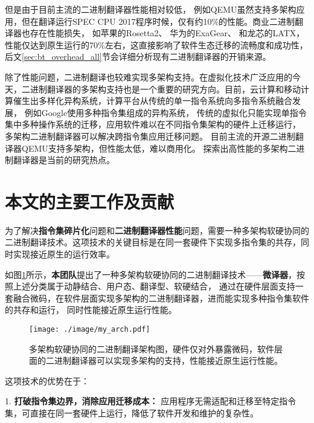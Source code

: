 但是由于目前主流的二进制翻译器性能相对较低，
例如QEMU\cite{bellardQEMUFastPortable2005}虽然支持多架构应用，但在翻译运行SPEC CPU 2017\cite{SPECCPU2017}程序时候，仅有约10\%的性能。商业二进制翻译器也存在性能损失，
如苹果的Rosetta2\cite{RosettaTranslationEnvironment, RunningIntelBinaries}、
华为的ExaGear\cite{KunPengExaGear}、
和龙芯的LATX\cite{LoongArchEnv2022, LoongArch2023}，
性能仅达到原生运行的70\%左右，这直接影响了软件生态迁移的流畅度和成功性，
后文\ref{sec:bt_overhead_all}节会详细分析现有二进制翻译器的开销来源。

除了性能问题，二进制翻译也较难实现多架构支持。在虚拟化技术广泛应用的今天，二进制翻译器的多架构支持也是一个重要的研究方向。目前，云计算和移动计算催生出多样化异构系统，计算平台从传统的单一指令系统向多指令系统融合发展，
例如Google使用多种指令集组成的异构系统，
传统的虚拟化只能实现单指令集中多种操作系统的迁移，应用软件难以在不同指令集架构的硬件上迁移运行，
多架构二进制翻译器可以解决跨指令集应用迁移问题。
目前主流的开源二进制翻译器QEMU支持多架构，但性能太低，难以商用化。
探索出高性能的多架构二进制翻译器是当前的研究热点。

\section{本文的主要工作及贡献}

为了解决\textbf{指令集碎片化}问题和\textbf{二进制翻译器性能}问题，需要一种多架构软硬协同的二进制翻译技术。这项技术的关键目标是在同一套硬件下实现多指令集的共存，同时实现接近原生的运行效率。

如图\ref{img:my_arch}所示，\textbf{本团队}提出了一种多架构软硬协同的二进制翻译技术——\textbf{微译器}，按照上述分类属于动静结合、用户态、翻译型、软硬结合，
通过在硬件层面支持一套融合微码，在软件层面实现多架构的二进制翻译器，进而能实现多种指令集软件的共存和运行，
同时性能接近原生运行性能。


\begin{figure}[!htbp]
    \centering
    \texttt{[image: ./image/my\_arch.pdf]}
    \caption{多架构软硬协同的二进制翻译架构图，硬件仅对外暴露微码，软件层面的二进制翻译器可以实现多架构的支持，性能接近原生运行性能。}
    \label{img:my_arch}
  \end{figure}

这项技术的优势在于：

1. \textbf{打破指令集边界，消除应用迁移成本：} 应用程序无需适配和迁移至特定指令集，可直接在同一套硬件上运行，降低了软件开发和维护的复杂性。

